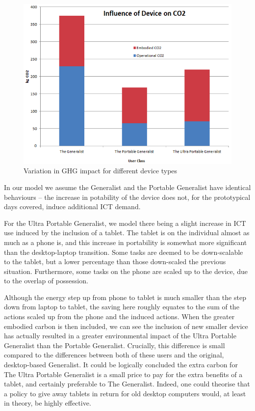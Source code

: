 \documentclass[conference]{IEEEtran}
\begin{document}
\begin{figure}[!ht]
\centering
\includegraphics[width=0.9\columnwidth]{images/ghgimpact_devicetypes.png}
\caption{Variation in GHG impact for different device types}
\label{fig:ghgimpact_devicetype} 
\end{figure}

In our model we assume the Generalist and the Portable Generalist have
identical behaviours -- the increase in potability of the device does
not, for the prototypical days covered, induce additional ICT demand.


For the Ultra Portable Generalist, we model there being a slight
increase in ICT use induced by the inclusion of a tablet. The tablet is
on the individual almost as much as a phone is, and this increase in
portability is somewhat more significant than the desktop-laptop
transition. Some tasks are deemed to be down-scalable to the tablet,
but a lower percentage than those down-scaled the previous
situation. Furthermore, some tasks on the phone are scaled up to the
device, due to the overlap of possession.

Although the energy step up from phone to tablet is much smaller than
the step down from laptop to tablet, the saving here roughly equates
to the sum of the actions scaled up from the phone and the induced
actions. When the greater embodied carbon is then included, we can see
the inclusion of new smaller device has actually resulted in a greater
environmental impact of the Ultra Portable Generalist than the
Portable Generalist. Crucially, this difference is small compared to
the differences between both of these users and the original,
desktop-based Generalist. It could be logically concluded the extra
carbon for The Ultra Portable Generalist is a small price to pay for
the extra benefits of a tablet, and certainly preferable to The
Generalist. Indeed, one could theorise that a policy to give away
tablets in return for old desktop computers would, at least in theory,
be highly effective.
\end{document}
